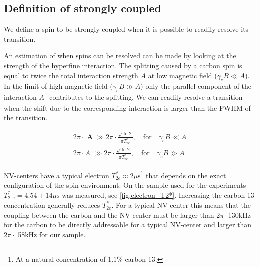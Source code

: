 \subsection{Definition of strongly coupled }
We define a spin to be strongly coupled when it is possible to readily resolve its transition.

An estimation of when spins can be resolved can be made by looking at the strength of the hyperfine interaction.
The splitting caused by a carbon spin is equal to twice the total interaction strength $A$ at low magnetic field ($\gamma_e B \ll A$). In the limit of high magnetic field ($\gamma_e B \gg A$) only the parallel component of the interaction $A_\parallel$ contributes to the splitting.
We can readily resolve a transition when the shift due to the corresponding interaction is larger than the FWHM of the transition.

\begin{align}
     2\pi \cdot |\bm{A}|\gg 2\pi \cdot \frac{\sqrt{\ln{2}}}{\pi T_{2e}^*} , \quad \mathrm{for } \quad \gamma_e B \ll A  \\
     2\pi \cdot A_\parallel \gg 2\pi \cdot \frac{\sqrt{\ln{2}}}{\pi T_{2e}^*}, \quad \mathrm{for } \quad \gamma_e B \gg A
     \label{eq:def_strongly_coupled}
 \end{align}

NV-centers have a typical electron $T_{2e}^* \approx 2\mu \mathrm{s}$\footnote{At a natural concentration of $1.1 \%$ carbon-13.} that depends on the exact configuration of the spin-environment.
On the sample used for the experiments $T_{2,e}^* = 4.54 \pm 14 \mu\mathrm{s}$ was measured, see \cref{fig:electron_T2*}.
Increasing the carbon-13 concentration generally reduces $T_{2e}^*$.
For a typical NV-center this means that the coupling between the carbon and the NV-center must be larger than $2\pi\cdot$130kHz for the carbon to be directly addressable for a typical NV-center and larger than $2\pi\cdot$ 58kHz for our sample.




























































